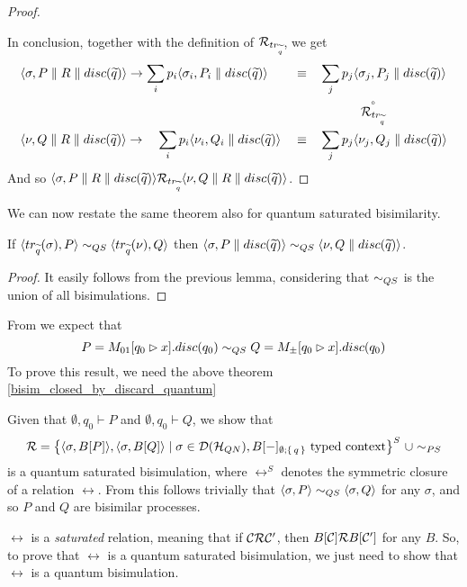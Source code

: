 \begin{proof}
\begin{itemize}
\end{itemize}
In conclusion, together with the definition of $\mathcal{R}_{tr_{\widetilde{q}}}$, we get
\begin{align*}
& \langle\sigma, P\parallel R \parallel disc(\widetilde{q})\rangle \rightarrow \sum_i p_i \langle\sigma_i, P_i \parallel disc(\widetilde{q})\rangle & & \equiv  &  & \sum_j p_j \langle\sigma_j, P_j \parallel disc(\widetilde{q})\rangle 
\\
 & & & & & \qquad\quad\stackrel{\scriptscriptstyle \circ}{\mathcal{R}_{tr_{\widetilde{q}}}} 
\\
& \langle\nu, Q\parallel R\parallel disc(\widetilde{q})\rangle \rightarrow \quad\sum_i p_i \langle\nu_i, Q_i\parallel disc(\widetilde{q})\rangle & & \equiv & &  \sum_j p_j \langle\nu_j, Q_j\parallel disc(\widetilde{q})\rangle
\end{align*}
And so $\langle\sigma, P\parallel R \parallel disc(\widetilde{q})\rangle \mathcal{R}_{tr_{\widetilde{q}}}\langle\nu, Q\parallel R\parallel disc(\widetilde{q})\rangle$.
\end{proof}

We can now restate the same theorem also for quantum saturated bisimilarity.

\begin{theorem}\label{bisim_closed_by_discard_quantum}
If $\langle tr_{\widetilde{q}}(\sigma), P\rangle \sim_{QS} \langle tr_{\widetilde{q}}(\nu), Q\rangle$ then $\langle\sigma, P \parallel disc(\widetilde{q})\rangle \sim_{QS} \langle\nu, Q \parallel disc(\widetilde{q})\rangle$.
\end{theorem}
\begin{proof}
It easily follows from the previous lemma, considering that $\sim_{QS}$ is the union of all bisimulations.
\end{proof}

From \cite{davidsonFormalVerificationTechniques2012} we expect that $$P =  M_{01}[q_0 \rhd x].disc(q_0) \sim_{QS} Q = M_\pm[q_0 \rhd x].disc(q_0)$$To prove this result, we need the above theorem \ref{bisim_closed_by_discard_quantum}


Given that $\emptyset, {q_0} \vdash P$ and $\emptyset, {q_0} \vdash Q$, we show that
\[\mathcal{R} = \big\{ \langle\sigma, B[P]\rangle, \langle\sigma, B[Q]\rangle \mid \sigma \in \mathcal{D}(\mathcal{H}_{QN}), B[{-}]_{\emptyset; \set{q}} \text{ typed context}\big\}^S\ \cup \sim_{PS}
\]
is a quantum saturated bisimulation, where $\rel^S$ denotes the symmetric closure of a relation $\rel$. From this follows trivially that $\langle\sigma, P\rangle \sim_{QS} \langle\sigma, Q\rangle$ for any $\sigma$, and so $P$ and $Q$ are bisimilar processes.

$\rel$ is a \textit{saturated} relation, meaning that if $\mathcal{C} \mathcal{R} \mathcal{C}'$, then $B[\mathcal{C}] \mathcal{R} B[\mathcal{C}']$ for any $B$. So, to prove that $\rel$ is a quantum saturated bisimulation, we just need to show that $\rel$ is a quantum bisimulation.

